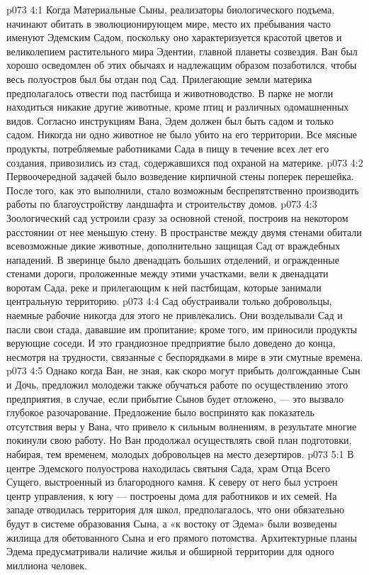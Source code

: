 \vs p073 4:1 Когда Материальные Сыны, реализаторы биологического подъема, начинают обитать в эволюционирующем мире, место их пребывания часто именуют Эдемским Садом, поскольку оно характеризуется красотой цветов и великолепием растительного мира Эдентии, главной планеты созвездия. Ван был хорошо осведомлен об этих обычаях и надлежащим образом позаботился, чтобы весь полуостров был бы отдан под Сад. Прилегающие земли материка предполагалось отвести под пастбища и животноводство. В парке не могли находиться никакие другие животные, кроме птиц и различных одомашненных видов. Согласно инструкциям Вана, Эдем должен был быть садом и только садом. Никогда ни одно животное не было убито на его территории. Все мясные продукты, потребляемые работниками Сада в пищу в течение всех лет его создания, привозились из стад, содержавшихся под охраной на материке.
\vs p073 4:2 Первоочередной задачей было возведение кирпичной стены поперек перешейка. После того, как это выполнили, стало возможным беспрепятственно производить работы по благоустройству ландшафта и строительству домов.
\vs p073 4:3 Зоологический сад устроили сразу за основной стеной, построив на некотором расстоянии от нее меньшую стену. В пространстве между двумя стенами обитали всевозможные дикие животные, дополнительно защищая Сад от враждебных нападений. В зверинце было двенадцать больших отделений, и огражденные стенами дороги, проложенные между этими участками, вели к двенадцати воротам Сада, реке и прилегающим к ней пастбищам, которые занимали центральную территорию.
\vs p073 4:4 Сад обустраивали только добровольцы, наемные рабочие никогда для этого не привлекались. Они возделывали Сад и пасли свои стада, дававшие им пропитание; кроме того, им приносили продукты верующие соседи. И это грандиозное предприятие было доведено до конца, несмотря на трудности, связанные с беспорядками в мире в эти смутные времена.
\vs p073 4:5 Однако когда Ван, не зная, как скоро могут прибыть долгожданные Сын и Дочь, предложил молодежи также обучаться работе по осуществлению этого предприятия, в случае, если прибытие Сынов будет отложено, --- это вызвало глубокое разочарование. Предложение было воспринято как показатель отсутствия веры у Вана, что привело к сильным волнениям, в результате многие покинули свою работу. Но Ван продолжал осуществлять свой план подготовки, набирая, тем временем, молодых добровольцев на место дезертиров.
\vs p073 5:1 В центре Эдемского полуострова находилась святыня Сада, храм Отца Всего Сущего, выстроенный из благородного камня. К северу от него был устроен центр управления, к югу --- построены дома для работников и их семей. На западе отводилась территория для школ, предполагалось, что они обязательно будут в системе образования Сына, а «к востоку от Эдема» были возведены жилища для обетованного Сына и его прямого потомства. Архитектурные планы Эдема предусматривали наличие жилья и обширной территории для одного миллиона человек.

